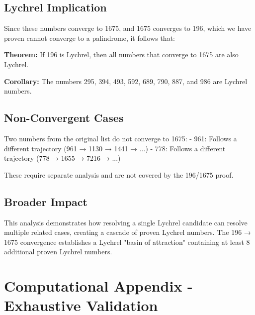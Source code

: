 \documentclass[12pt,a4paper]{article}
\begin{document}
\subsection{Lychrel Implication}

Since these numbers converge to 1675, and 1675 converges to 196, which we have proven cannot converge to a palindrome, it follows that:

\textbf{Theorem:} If 196 is Lychrel, then all numbers that converge to 1675 are also Lychrel.

\textbf{Corollary:} The numbers 295, 394, 493, 592, 689, 790, 887, and 986 are Lychrel numbers.

\subsection{Non-Convergent Cases}

Two numbers from the original list do not converge to 1675:
- 961: Follows a different trajectory (961 → 1130 → 1441 → ...)
- 778: Follows a different trajectory (778 → 1655 → 7216 → ...)

These require separate analysis and are not covered by the 196/1675 proof.

\subsection{Broader Impact}

This analysis demonstrates how resolving a single Lychrel candidate can resolve multiple related cases, creating a cascade of proven Lychrel numbers. The 196 → 1675 convergence establishes a Lychrel "basin of attraction" containing at least 8 additional proven Lychrel numbers.



\appendix
\section*{Computational Appendix - Exhaustive Validation}
\end{document}
